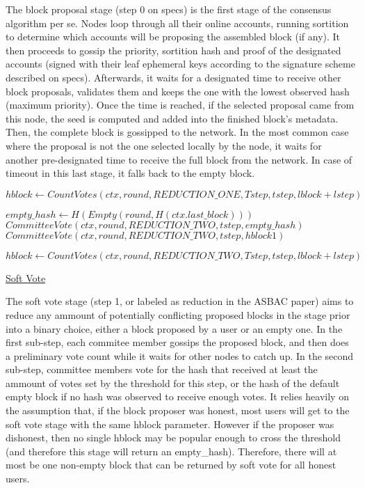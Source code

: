 \documentclass[10pt,a4paper]{article}
\begin{document}
The block proposal stage (step 0 on specs) is the first stage of the consensus algorithm per se. Nodes loop through all their online accounts, running sortition to determine which accounts will be proposing the assembled block (if any).
It then proceeds to gossip the priority, sortition hash and proof of the designated accounts (signed with their leaf ephemeral keys according to the signature scheme described on specs).
Afterwards, it waits for a designated time to receive other block proposals, validates them and keeps the one with the lowest observed hash (maximum priority).
Once the time is reached, if the selected proposal came from this node, the seed is computed and added into the finished block's metadata. Then, the complete block is gossipped to the network.
In the most common case where the proposal is not the one selected locally by the node, it waits for another pre-designated time to receive the full block from the network.
In case of timeout in this last stage, it falls back to the empty block.

\begin{algorithm}
    \begin{algorithmic}[1]
    
    \State $hblock \gets CountVotes(ctx, round, REDUCTION\_ONE, Tstep, tstep, lblock+lstep)$

    \State $empty\_hash \gets H(Empty(round, H(ctx.last\_block)))$
        {\State $CommitteeVote(ctx, round, REDUCTION\_TWO, tstep, empty\_hash)$}
        {\State $CommitteeVote(ctx, round, REDUCTION\_TWO, tstep, hblock1)$}
    \EndIfThenElse

    \State $hblock \gets CountVotes(ctx, round, REDUCTION\_TWO, Tstep, tstep, lblock+lstep)$ 


    \EndFunction
    \end{algorithmic}
    \caption{\underline{Soft Vote}}
\end{algorithm}

The soft vote stage (step 1, or labeled as reduction in the ASBAC paper) aims to reduce any ammount of potentially conflicting proposed blocks in the stage prior into a binary choice, either a block proposed by a user or an empty one.
In the first sub-step, each commitee member gossips the proposed block, and then does a preliminary vote count while it waits for other nodes to catch up.
In the second sub-step, committee members vote for the hash that received at least the ammount of votes set by the threshold for this step, or the hash of the default empty block if no hash was observed to receive enough votes.
It relies heavily on the assumption that, if the block proposer was honest, most users will get to the soft vote stage with the same hblock parameter.
However if the proposer was dishonest, then no single hblock may be popular enough to cross the threshold (and therefore this stage will return an empty\_hash).
Therefore, there will at most be one non-empty block that can be returned by soft vote for all honest users.
\end{document}
